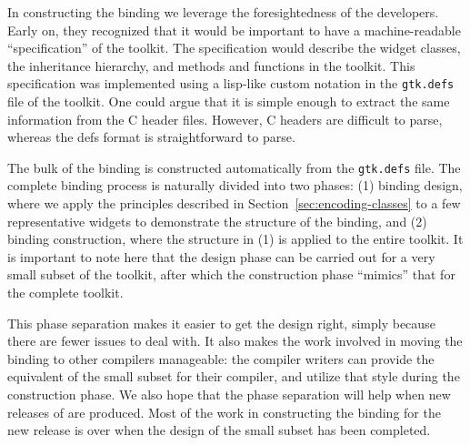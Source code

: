 \documentclass[finalversion]{usetex-v1}
\begin{document}
In constructing the \mgtk binding we leverage the foresightedness of
the \gtk developers. Early on, they recognized that it would be
important to have a machine-readable ``specification'' of the toolkit.
The specification would describe the widget classes, the
inheritance hierarchy, and methods and functions in the toolkit. This
specification was implemented using a lisp-like custom notation in the
\texttt{gtk.defs} file of the toolkit. One could
argue that it is simple enough to extract the same information from
the C header files. However, C headers are difficult to parse, whereas
the defs format is straightforward to parse.

The bulk of the \mgtk binding is constructed automatically from the
\texttt{gtk.defs} file.  The complete binding process is naturally
divided into two phases: (1) binding design, where we apply the
principles described in Section~\ref{sec:encoding-classes} to a few
representative widgets to demonstrate the structure of the binding,
and (2) binding construction, where the structure in (1) is applied to
the entire toolkit. It is important to note here that the design phase
can be carried out for a very small subset of the toolkit, after which
the construction phase ``mimics'' that for the complete toolkit.

This phase separation makes it easier to get the design right, simply
because there are fewer issues to deal with.  It also makes the work
involved in moving the binding to other \sml compilers manageable:
the compiler writers can provide the equivalent
of the small subset for their compiler, and utilize that style during the
construction phase. We also hope that the phase separation will help when new releases
of \gtk are produced. Most of the work in constructing the binding for
the new release is over when the design of the small subset has been
completed.
\end{document}
